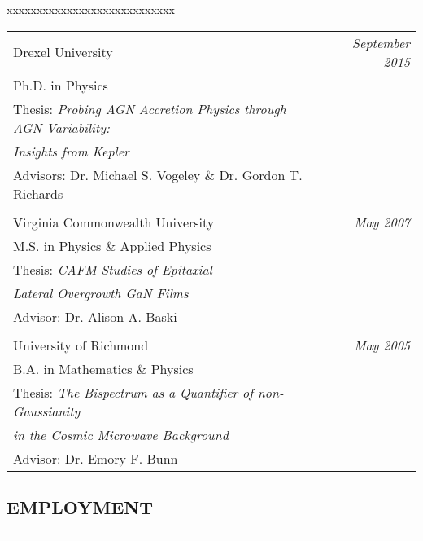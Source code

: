 \documentclass[10pt,a4]{article}
\begin{document}
\begin{tabbing}
xxxx\=xxxxxxxx\=xxxxxxxx\=xxxxxxxx\=\kill
\>\begin{tabular*}{0.9\linewidth}{l@{\extracolsep{\fill}}r}

Drexel University & {\it September 2015} \\
Ph.D. in Physics  & \\
Thesis: \it{Probing AGN Accretion Physics through AGN Variability:} \\
\hspace{1.1cm} \it{Insights from Kepler} \\
Advisors: Dr. Michael S. Vogeley \& Dr. Gordon T. Richards \\
 & \\

Virginia Commonwealth University & {\it May 2007} \\
M.S. in Physics \& Applied Physics & \\
Thesis: \it{CAFM Studies of Epitaxial} \\ 
\hspace{1.1cm} \it{Lateral Overgrowth GaN Films} \\
Advisor: Dr. Alison A. Baski \\
 & \\

University of Richmond & {\it May 2005} \\
B.A. in Mathematics \& Physics  & \\
Thesis: \it{The Bispectrum as a Quantifier of non-Gaussianity} \\ 
\hspace{1.1cm} \it{in the Cosmic Microwave 	Background} \\
Advisor: Dr. Emory F. Bunn \\

\end{tabular*}
\end{tabbing}

\subsection*{EMPLOYMENT}
\hrule  height 4pt
\vspace{0.2cm}
\end{document}
